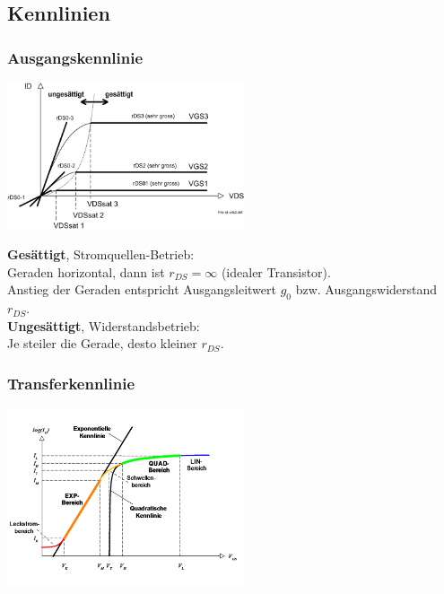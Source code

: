 \subsection{Kennlinien}
\subsubsection{Ausgangskennlinie}
\begin{minipage}{8cm}
	\centering
	\includegraphics[width=7cm]{images/Ausgangskennlinie.png}
\end{minipage}
\begin{minipage}{10cm}
	\textbf{Gesättigt}, Stromquellen-Betrieb:\\
	Geraden horizontal, dann ist $r_{DS}=\infty$ (idealer Transistor). \\
	Anstieg der Geraden entspricht Ausgangsleitwert $g_0$ bzw. Ausgangswiderstand $r_{DS}$. \\
	
	\textbf{Ungesättigt}, Widerstandsbetrieb: \\
	Je steiler die Gerade, desto kleiner $r_{DS}$. \\
\end{minipage}

\subsubsection{Transferkennlinie}
{	\centering
	\qquad\qquad
		\includegraphics[width=7cm]{images/Transferkennlinie.png}
} \\

